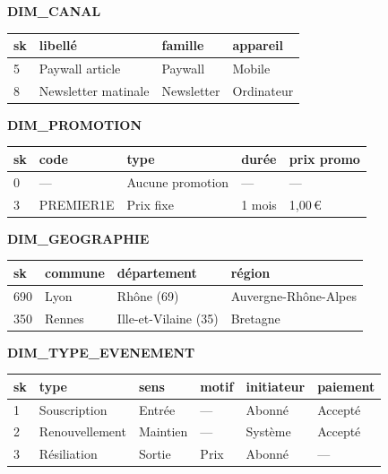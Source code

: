 \documentclass[a4paper,12pt]{article}
\begin{document}
\begin{center}
\medskip

\begin{minipage}[t]{0.49\linewidth}\centering
\textbf{DIM\_CANAL}\\[2pt]
\begin{tabular}{@{}llll@{}}
  \toprule
  sk & libellé & famille & appareil \\
  \midrule
  5 & Paywall article     & Paywall    & Mobile \\
  8 & Newsletter matinale & Newsletter & Ordinateur \\
  \bottomrule
\end{tabular}
\end{minipage}%
\hfill%
\begin{minipage}[t]{0.49\linewidth}\centering
\textbf{DIM\_PROMOTION}\\[2pt]
\begin{tabular}{@{}lllll@{}}
  \toprule
  sk & code & type & durée & prix promo \\
  \midrule
  0 & --- & Aucune promotion & --- & --- \\
  3 & PREMIER1E & Prix fixe & 1 mois & 1,00\,€ \\
  \bottomrule
\end{tabular}
\end{minipage}

\medskip

\begin{minipage}[t]{0.49\linewidth}\centering
\textbf{DIM\_GEOGRAPHIE}\\[2pt]
\begin{tabular}{@{}llll@{}}
  \toprule
  sk & commune & département & région \\
  \midrule
  690 & Lyon   & Rhône (69)           & Auvergne-Rhône-Alpes \\
  350 & Rennes & Ille-et-Vilaine (35) & Bretagne \\
  \bottomrule
\end{tabular}
\end{minipage}%
\hfill%
\begin{minipage}[t]{0.49\linewidth}\centering
\textbf{DIM\_TYPE\_EVENEMENT}\\[2pt]
\begin{tabular}{@{}llllll@{}}
  \toprule
  sk & type & sens & motif & initiateur & paiement \\
  \midrule
  1 & Souscription   & Entrée   & --- & Abonné  & Accepté \\
  2 & Renouvellement & Maintien & --- & Système & Accepté \\
  3 & Résiliation    & Sortie   & Prix & Abonné & --- \\
  \bottomrule
\end{tabular}
\end{minipage}


\end{center}
\end{document}
